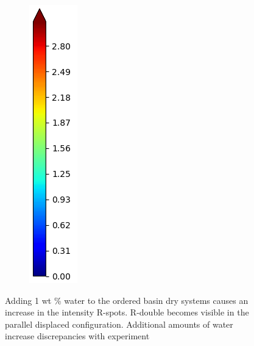\documentclass[journal=jpcbfk,manusciprt=article]{achemso}
\begin{document}
\begin{figure}[!htb]
\begin{subfigure}{0.075\textwidth}
  	\includegraphics[width=\textwidth]{colorbar_jet.png}
  \end{subfigure}
	\caption{Adding 1 wt \% water to the ordered basin dry systems causes an increase in the intensity
	R-spots. R-double becomes visible in the parallel displaced configuration. Additional amounts
	of water increase discrepancies with experiment} %
  \label{fig:solvation}

  \end{figure}
\end{document}
